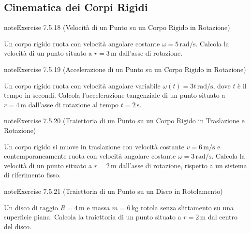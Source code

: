 \documentclass[letterpaper,10pt,italian]{jupyterBook}
\begin{document}
\subsection{Cinematica dei Corpi Rigidi}
\label{\detokenize{ch/mechanics/kinematics-problems:cinematica-dei-corpi-rigidi}} \label{exercise:ch/mechanics/kinematics-problems-exercise-17}

\begin{sphinxadmonition}{note}{Exercise 7.5.18 (Velocità di un Punto su un Corpo Rigido in Rotazione)}



\sphinxAtStartPar
Un corpo rigido ruota con velocità angolare costante \(\omega = 5 \, \text{rad/s}\). Calcola la velocità di un punto situato a \(r = 3 \, \text{m}\) dall’asse di rotazione.
\end{sphinxadmonition}
 \label{exercise:ch/mechanics/kinematics-problems-exercise-18}

\begin{sphinxadmonition}{note}{Exercise 7.5.19 (Accelerazione di un Punto su un Corpo Rigido in Rotazione)}



\sphinxAtStartPar
Un corpo rigido ruota con velocità angolare variabile \(\omega(t) = 3t \, \text{rad/s}\), dove \(t\) è il tempo in secondi. Calcola l’accelerazione tangenziale di un punto situato a \(r = 4 \, \text{m}\) dall’asse di rotazione al tempo \(t = 2 \, \text{s}\).
\end{sphinxadmonition}
 \label{exercise:ch/mechanics/kinematics-problems-exercise-19}

\begin{sphinxadmonition}{note}{Exercise 7.5.20 (Traiettoria di un Punto su un Corpo Rigido in Traslazione e Rotazione)}



\sphinxAtStartPar
Un corpo rigido si muove in traslazione con velocità costante \(v = 6 \, \text{m/s}\) e contemporaneamente ruota con velocità angolare costante \(\omega = 3 \, \text{rad/s}\). Calcola la velocità di un punto situato a \(r = 2 \, \text{m}\) dall’asse di rotazione, rispetto a un sistema di riferimento fisso.
\end{sphinxadmonition}
 \label{exercise:ch/mechanics/kinematics-problems-exercise-20}

\begin{sphinxadmonition}{note}{Exercise 7.5.21 (Traiettoria di un Punto su un Disco in Rotolamento)}



\sphinxAtStartPar
Un disco di raggio \(R = 4 \, \text{m}\) e massa \(m = 6 \, \text{kg}\) rotola senza slittamento su una superficie piana. Calcola la traiettoria di un punto situato a \(r = 2 \, \text{m}\) dal centro del disco.
\end{sphinxadmonition}
 \label{exercise:ch/mechanics/kinematics-problems-exercise-21}
\end{document}
